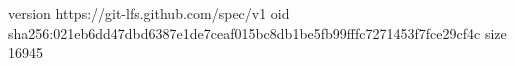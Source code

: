 version https://git-lfs.github.com/spec/v1
oid sha256:021eb6dd47dbd6387e1de7ceaf015bc8db1be5fb99fffc7271453f7fce29cf4c
size 16945

